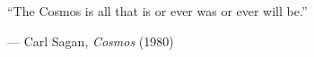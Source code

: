 \newpage
\thispagestyle{empty}
\vspace*{2cm} %

\begin{center} 
  \begin{flushright}
    \large
    ``The Cosmos is all that is or ever was or ever will be.'' 

    \vspace{0.5cm} 
    --- Carl Sagan, \textit{Cosmos} (1980)
  \end{flushright}
\end{center}
